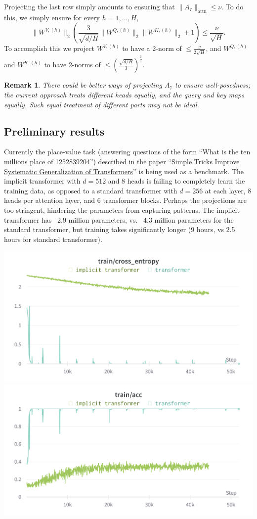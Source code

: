 \documentclass{article}
\newtheorem{remark}{Remark}
\begin{document}
Projecting the last row simply amounts to ensuring that $\|A_7\|_\text{attn}\leq
\nu$. To do this, we simply ensure for every $h=1,\ldots, H$,
\begin{equation*}
  \|W^{V, (h)}\|_2 \left(\frac3{\sqrt{d/H}}\|W^{Q, (h)}\|_2\|W^{K, (h)}\|_2 + 1
  \right) \leq \frac\nu{\sqrt H}.
\end{equation*}
To accomplish this we project $W^{V, (h)}$ to have a 2-norm of $\leq\frac\nu{2\sqrt
H}$, and $W^{Q, (h)}$ and $W^{K, (h)}$ to have 2-norms of $\leq\left(\frac{
\sqrt{d/H}}3\right)^{\frac12}$.
\begin{remark}
  There could be better ways of projecting $A_7$ to ensure well-posedness; 
  the current approach treats different heads equally, and the query and key
  maps equally. Such equal treatment of different parts may not be ideal.
\end{remark}
\subsection{Preliminary results}
Currently the place-value task (answering questions of the form ``What is the 
ten millions place of 1252839204'') described in the paper 
``\href{https://arxiv.org/pdf/2108.12284.pdf}{Simple Tricks Improve Systematic
Generalization of Transformers}'' is being used as a benchmark. The implicit
transformer with $d=512$ and 8 heads is failing to completely learn
the training data, as opposed to a standard transformer with $d=256$ at each
layer, 8 heads per attention layer, and 6 transformer blocks. Perhaps
the projections are too stringent, hindering the parameters from capturing
patterns. The implicit transformer has ~2.9 million parameters, vs. 
~4.3 million parameters for the standard transformer, but training takes
significantly longer (9 hours, vs 2.5 hours for standard transformer).

\includegraphics[width=0.8\linewidth]{images/tvit_ce.png}\\
\includegraphics[width=0.8\linewidth]{images/tvit_acc.png}
\end{document}
